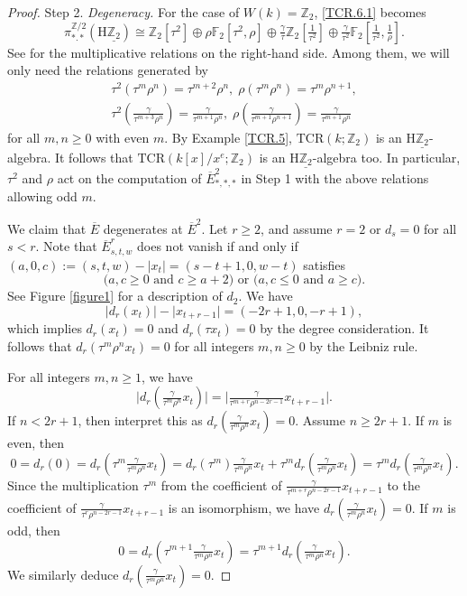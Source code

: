 \documentclass[10pt]{amsart}
\theoremstyle{definition}
\numberwithin{equation}{section}
\newcommand{\F}{\mathbb{F}}
\newcommand{\Z}{\mathbb{Z}}
\newcommand{\rH}{\mathrm{H}}
\newcommand{\ul}{\underline}
\newcommand{\ol}{\overline}
\newcommand{\TCR}{\mathrm{TCR}}
\begin{document}
{\begin{proof}
Step 2. \emph{Degeneracy.}
For the case of $W(k)=\Z_2$, \eqref{TCR.6.1} becomes
\[
\pi_{*.*}^{\Z/2}(\rH \ul{\Z_2})
\cong
\Z_2[\tau^2] \oplus \rho \F_2[\tau^2,\rho] \oplus \tfrac{\gamma}{\tau} \Z_2[\tfrac{1}{\tau^2}] \oplus \tfrac{\gamma}{\tau^2} \F_2 [\tfrac{1}{\tau^2},\tfrac{1}{\rho}].
\]
See \cite[Definition 3.3, Proposition 3.4]{MR4669153} for the multiplicative relations on the right-hand side.
Among them, we will only need the relations generated by
\begin{gather*}
\tau^2 (\tau^{m} \rho^n) = \tau^{m+2}\rho^n,
\;
\rho (\tau^{m} \rho^{n}) = \tau^{m} \rho^{n+1},
\\
\tau^2 (\tfrac{\gamma}{\tau^{m+3}\rho^n}) = \tfrac{\gamma}{\tau^{m+1}\rho^n},
\;
\rho (\tfrac{\gamma}{\tau^{m+1}\rho^{n+1}}) = \tfrac{\gamma}{\tau^{m+1}\rho^n}
\end{gather*}
for all $m,n\geq 0$ with even $m$.
By Example \ref{TCR.5},
$\TCR(k;\Z_2)$ is an $\rH \ul{\Z_2}$-algebra.
It follows that 
$\TCR(k[x]/x^e;\Z_2)$ is an $\rH \ul{\Z_2}$-algebra too.
In particular,
$\tau^2$ and $\rho$ act on the computation of $\ol{E}_{*,*,*}^2$ in Step 1 with the above relations allowing odd $m$.

We claim that $\overline{E}$ degenerates at $\overline{E}^2$.
Let $r\geq 2$, and assume $r=2$ or $d_s=0$ for all $s<r$.
Note that $\overline{E}_{s,t,w}^r$ does not vanish if and only if $(a,0,c):=(s,t,w)-\lvert x_t\rvert = (s-t+1,0,w-t)$ satisfies
\[
\text{
($a,c\geq 0$ and $c\geq a+2$)
or
($a,c\leq 0$ and $a\geq c$).
}
\]
See Figure \ref{figure1} for a description of $d_2$.
We have
\[
\lvert d_r(x_t)\rvert -\lvert x_{t+r-1}\rvert= (-2r+1,0,-r+1),
\]
which implies $d_r(x_t)=0$ and $d_r(\tau x_t)=0$ by the degree consideration.
It follows that $d_r(\tau^m\rho^n x_t)=0$ for all integers $m,n\geq 0$ by the Leibniz rule.

For all integers $m,n\geq 1$,
we have
\[
\lvert d_r(\tfrac{\gamma}{\tau^m \rho^n}x_t)\rvert = \lvert \tfrac{\gamma}{\tau^{m+r}\rho^{n-2r-1}} x_{t+r-1}\rvert.
\]
If $n<2r+1$, then interpret this as $d_r(\tfrac{\gamma}{\tau^m \rho^n}x_t)=0$.
Assume $n\geq 2r+1$.
If $m$ is even,
then
\[
0 = d_r(0) = d_r(\tau^m \tfrac{\gamma}{\tau^m \rho^n} x_t)
=
d_r(\tau^m) \tfrac{\gamma}{\tau^m \rho^n} x_t + \tau^m d_r(\tfrac{\gamma}{\tau^m \rho^n} x_t)
=
\tau^m d_r(\tfrac{\gamma}{\tau^m \rho^n} x_t).
\]
Since the multiplication $\tau^m$ from the coefficient of $\tfrac{\gamma}{\tau^{m+r}\rho^{n-2r-1}} x_{t+r-1}$ to the coefficient of $\tfrac{\gamma}{\tau^{r}\rho^{n-2r-1}} x_{t+r-1}$ is an isomorphism,
we have $d_r(\tfrac{\gamma}{\tau^m \rho^n} x_t)=0$.
If $m$ is odd,
then
\[
0 = d_r(\tau^{m+1} \tfrac{\gamma}{\tau^m \rho^n} x_t)
=
\tau^{m+1} d_r(\tfrac{\gamma}{\tau^m \rho^n} x_t).
\]
We similarly deduce $d_r(\tfrac{\gamma}{\tau^m \rho^n} x_t)=0$.


\end{proof}}
\end{document}
